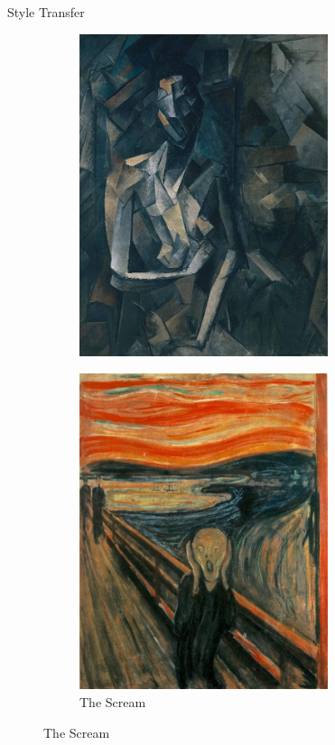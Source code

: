 \documentclass{beamer}
\begin{document}
\begin{frame}{Style Transfer}
\begin{figure}
{\begin{figure}[ht]
    \includegraphics[width=0.8\textwidth,height=0.27\textheight]{img/artworks/seated-nude}
    \end{figure}
}{
    \begin{figure}[ht]
    \centering
    \caption*{The Scream}
    \includegraphics[width=0.8\textwidth,height=0.27\textheight]{img/artworks/scream}
    \end{figure}
}
\end{figure}
\end{frame}
\end{document}
